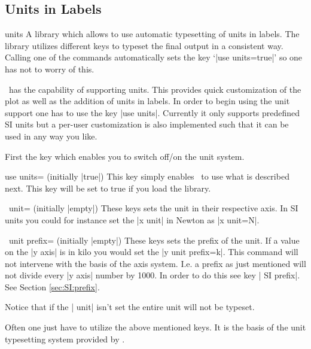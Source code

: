 \subsection{Units in Labels}
\label{sec:units}

\begin{pgfplotslibrary}{units}
	A library which allows to use automatic typesetting of units in labels. The library utilizes different keys to typeset the final output in a consistent way.
	Calling one of the commands automatically sets the key `|use units=true|' so one has not to worry of this.
\end{pgfplotslibrary}
 \PGFPlots\ has the capability of supporting units. This provides quick customization of the plot as well as the addition of units in labels. In order to
 begin using the unit support one has to use the key |use units|. Currently it only supports predefined SI units but a per-user customization is also
 implemented such that it can be used in any way you like.

 First the key which enables you to switch off/on the unit system.
\begin{pgfplotskey}{use units= (initially |true|)}
  This key simply enables \PGFPlots\ to use what is described next. This key will be set to true if you load the library.
\end{pgfplotskey}
\begin{pgfplotsxykey}{\x\ unit= (initially |empty|)}
  These keys sets the unit in their respective axis. In SI units you could for instance set the |x unit| in Newton as |x unit=N|.
\end{pgfplotsxykey}
\begin{pgfplotsxykey}{\x\ unit prefix= (initially |empty|)}
  These keys sets the prefix of the unit. If a value on the |y axis| is in kilo you would set the |y unit prefix=k|. This command will not intervene with
  the basis of the axis system. I.e. a prefix as just mentioned will not divide every |y axis| number by 1000. In order to do this see key | SI prefix|. See Section \ref{sec:SI:prefix}.
  
  Notice that if the | unit| isn't set the entire unit will not be typeset.
\end{pgfplotsxykey}
Often one just have to utilize the above mentioned keys. It is the basis of the unit typesetting system provided by \PGFPlots. 
\begin{codeexample}[]
\end{codeexample}

